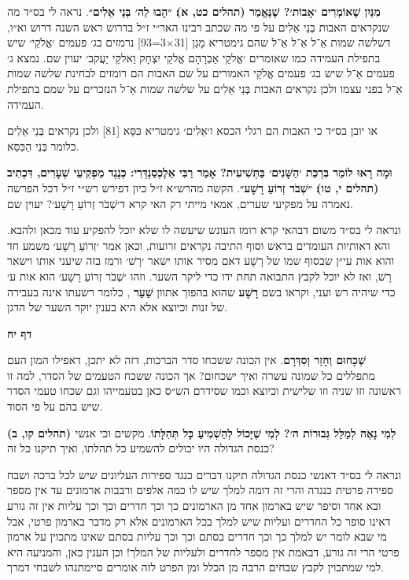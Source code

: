 \documentclass[12pt, openany]{book}
\newcommand{\sethebfont}{
\fontsize{10.5pt}{13.1pt} \selectfont
}
\newcommand{\textblock}[1]{
{\sethebfont #1\\}	
}
\newcommand{\sectname}{}
\newcommand{\newsection}[1]{
	\renewcommand{\sectname}{#1}	
	\vspace{-\baselineskip}
	\begin{center}
		\textbf{%
\fontsize{16pt}{16pt}\selectfont
			#1}
	\end{center}
	\vspace{-\baselineskip}
	\nopagebreak
}
\begin{document}
\textblock{\textbf{מִנַּיִן שֶׁאוֹמְרִים ׳אָבוֹת׳? שֶׁנֶּאֱמַר {\small (תהלים כט, א)}׃ ״הָבוּ לַה׳ בְּנֵי אֵלִים״}. נראה לי בס״ד מה שנקראים האבות בְּנֵי אֵלִים על פי מה שכתב רבינו האר״י ז״ל בדרוש ראש השנה דרוש וא״ו, דשלשה שמות אֵ־ל אֵ־ל אֵ־ל שהם גימטריא מָגֵן {\small [31×3=93]} נרמזים בג׳ פעמים ׳אֱלֹקֵי׳ שיש בתפילת העמידה כמו שאומרים ׳אֱלקֵי אַבְרָהָם אֱלקֵי יִצְחָק וֵאלקֵי יַעֲקב׳ יעוין שם. נמצא ג׳ פעמים אֵ־ל שיש בג׳ פעמים אֱלֹקֵי האמורים על שם האבות הם רומזים לבחינת שלשה שמות אֵ־ל בפני עצמו ולכן נקראים האבות בְּנֵי אֵלִים על שלשה שמות אֵ־ל הנזכרים על שמם בתפילת העמידה.\par או יובן בס״ד כי האבות הם רגלי הכסא ו׳אֵלִים׳ גימטריא כִּסֵּא {\small [81]} ולכן נקראים בְּנֵי אֵלִים כלומר בְּנֵי הַכִּסֵּא.}
\textblock{\textbf{וּמָה רָאוּ לוֹמַר בִּרְכַּת ׳הַשָּׁנִים׳ בַּתְּשִׁיעִית? אָמַר רַבִּי אַלֶכְּסַנְדְּרִי: כְּנֶגֶד מַפְקִיעֵי שְׁעָרִים, דִּכְתִיב {\small (תהלים י, טו)}׃ ״שְׁבֹר זְרוֹעַ רָשָׁע״}. הקשה מהרש״א ז״ל כיון דפירש רש״י ז״ל דכל הפרשה נאמרה על מפקיעי שערים, אמאי מייתי רק האי קרא ד׳שְׁבֹר זְרוֹעַ רָשָׁע׳? יעוין שם.\par ונראה לי בס״ד משום דבהאי קרא רומז העונש שיעשה לו שלא יוכל להפקיע עוד מכאן ולהבא. והא דאותיות העומדים בראש וסוף התיבה נקראים זרועות, וכאן אמר ׳זְרוֹעַ רָשָׁע׳ משמע חד והוא אות עי״ן שבסוף שמו של רָשָׁע דאם מסיר אותו ישאר ׳רָשׁ׳ ורמז בזה שיעני אותו וישאר רָשׁ, ואז לא יוכל לקבץ התבואה תחת ידו כדי ליקר השער. וזהו ׳שְׁבֹר זְרוֹעַ רָשָׁע׳ הוא אות ע׳ כדי שיהיה רש ועני, וקראו בשם \textbf{רָשָׁע} שהוא בהפוך אתוון \textbf{שַׁעַר} , כלומר רשעתו אינה בעבירה של זנות וכיוצא אלא היא בענין יוקר השער של הדגן.}
\clearpage
\newsection{דף יח}
\textblock{\textbf{שְׁכָחוּם וְחָזַר וְסִדְּרָם}. אין הכונה ששכחו סדר הברכות, דזה לא יתכן, דאפילו המון העם מתפללים כל שמונה עשרה ואיך ישכחום? אך הכונה ששכח הטעמים של הסדר, למה זו ראשונה וזו שניה וזו שלישית וכיוצא וכמו שסידרם הש״ס כאן בטעמייהו וגם שכחו טעמי הסדר שיש בהם על פי הסוד.}
\textblock{\textbf{{\small (תהלים קו, ב)} לְמִי נָאֶה לְמַלֵּל גְּבוּרוֹת ה׳? לְמִי שֶׁיָּכוֹל לְהַשְׁמִיעַ כָּל תְּהִלָּתוֹ}. מקשים וכי אנשי כנסת הגדולה היו יכולים להשמיע כל תהלתו, ואיך תיקנו כל זה?\par ונראה לי בס״ד דאנשי כנסת הגדולה תיקנו דברים כנגד ספירות העליונים שיש לכל ברכה ושבח ספירה פרטית כנגדה והרי זה דומה למלך שיש לו כמה אלפים ורבבות ארמונים עד אין מספר ובא אחד וסיפר שיש בארמון אחד מן הארמונים כך וכך חדרים וכך וכך עליות אין זה גורע דאינו סופר כל החדרים ועליות שיש למלך בכל הארמונים אלא רק מדבר בארמון פרטי, אבל מי שבא לומר יש למלך כך וכך חדרים בסתם וכך וכך עליות בסתם שאינו מתכוין על ארמון פרטי הרי זה גורע, דבאמת אין מספר לחדרים ולעליות של המלך! וכן הענין כאן, והמניעה היא למי שמתכוין לקבץ שבחים הרבה מן הכלל ומן הפרט לזה אומרים סיימתנהו לשבחי דמרך.}
\end{document}
